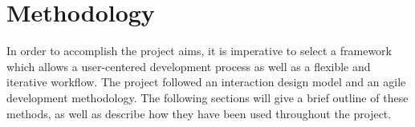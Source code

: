 \chapter{Methodology}
In order to accomplish the project aims, it is imperative to select a framework which allows a user-centered development process as well as a flexible and iterative workflow. The project followed an interaction design model and an agile development methodology. The following sections will give a brief outline of these methods, as well as describe how they have been used throughout the project.



\iffalse\fi